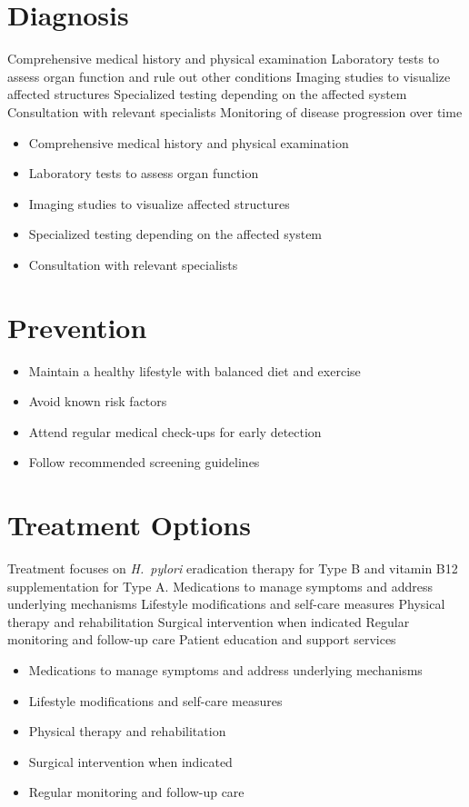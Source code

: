 \section{Diagnosis}
Comprehensive medical history and physical examination Laboratory tests to assess organ function and rule out other conditions Imaging studies to visualize affected structures Specialized testing depending on the affected system Consultation with relevant specialists Monitoring of disease progression over time

\begin{itemize}[noitemsep]
  \item Comprehensive medical history and physical examination
  \item Laboratory tests to assess organ function
  \item Imaging studies to visualize affected structures
  \item Specialized testing depending on the affected system
  \item Consultation with relevant specialists
\end{itemize}
\section{Prevention}
\begin{itemize}[noitemsep]
  \item Maintain a healthy lifestyle with balanced diet and exercise
  \item Avoid known risk factors
  \item Attend regular medical check-ups for early detection
  \item Follow recommended screening guidelines
\end{itemize}
\section{Treatment Options}
Treatment focuses on \textit{H.~pylori} eradication therapy for Type B and vitamin B12 supplementation for Type A. Medications to manage symptoms and address underlying mechanisms Lifestyle modifications and self-care measures Physical therapy and rehabilitation Surgical intervention when indicated Regular monitoring and follow-up care Patient education and support services

\begin{itemize}[noitemsep]
  \item Medications to manage symptoms and address underlying mechanisms
  \item Lifestyle modifications and self-care measures
  \item Physical therapy and rehabilitation
  \item Surgical intervention when indicated
  \item Regular monitoring and follow-up care
\end{itemize}
